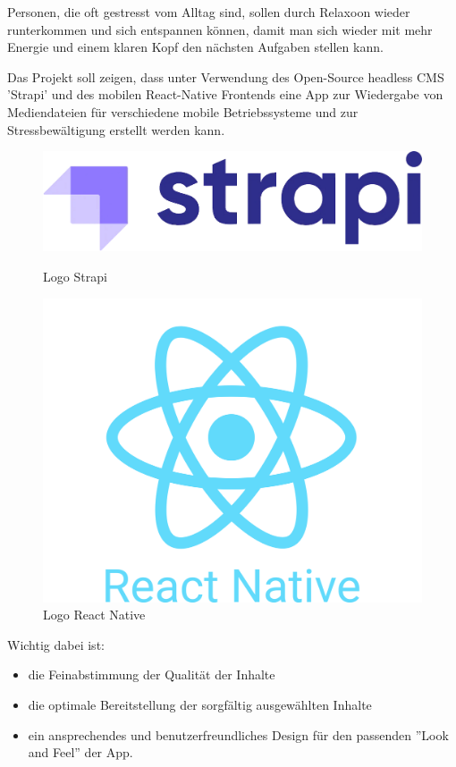 
Personen, die oft gestresst vom Alltag sind, sollen durch Relaxoon wieder runterkommen
und sich entspannen können, damit man sich wieder mit mehr Energie und einem klaren Kopf den
nächsten Aufgaben stellen kann.

Das Projekt soll zeigen, dass unter Verwendung des Open-Source headless CMS 'Strapi' und des mobilen
React-Native Frontends eine App zur Wiedergabe von Mediendateien für verschiedene mobile Betriebssysteme
und zur Stressbewältigung erstellt werden kann. 


\begin{figure}[H]
    \begin{minipage}{0.5\textwidth}
        \centering
        \includegraphics[height=0.2\textwidth]{./pics/strapi-logo.png}
        \caption{Logo Strapi}
    \end{minipage}
    \begin{minipage}{0.5\textwidth}
        \centering
        \includegraphics[height=0.6\textwidth]{./pics/react-native-logo.png}
        \caption{Logo React Native}
    \end{minipage}
\end{figure}

Wichtig dabei ist: 

\begin{itemize}
    \item die Feinabstimmung der Qualität der Inhalte
    \item die optimale Bereitstellung der sorgfältig ausgewählten Inhalte
    \item ein ansprechendes und benutzerfreundliches Design für den passenden ''Look and Feel'' der App.
\end{itemize}

